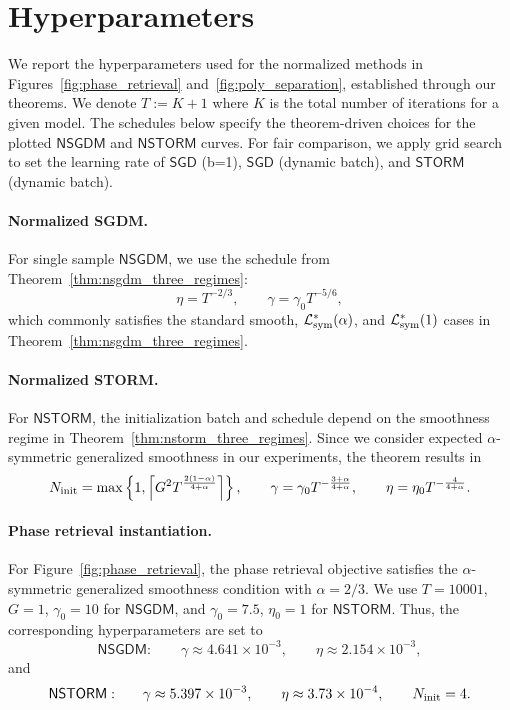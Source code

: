 \documentclass[letter,11pt]{article}
\newcommand{\Lcal}{\mathcal{L}}
\begin{document}
\section{Hyperparameters}
\label{app:exp_hyperparams}
We report the hyperparameters used for the normalized methods in Figures~\ref{fig:phase_retrieval} and~\ref{fig:poly_separation}, established through our theorems. We denote $T:=K+1$ where $K$ is the total number of iterations for a given model. The schedules below specify the theorem-driven choices for the plotted $\mathsf{NSGDM}$ and $\mathsf{NSTORM}$ curves. For fair comparison, we apply grid search to set the learning rate of $\mathsf{SGD}$ (b=1), $\mathsf{SGD}$ (dynamic batch), and $\mathsf{STORM}$ (dynamic batch).

\paragraph{Normalized SGDM.}
For single sample \(\mathsf{NSGDM}\), we use the schedule from Theorem~\ref{thm:nsgdm_three_regimes}:
\[
    \eta = T^{-2/3},
    \qquad
    \gamma = \gamma_0 T^{-5/6},
\]
which commonly satisfies the standard smooth, \(\Lcal_{\rm sym}^*(\alpha)\), and \(\Lcal_{\rm sym}^*(1)\) cases in Theorem~\ref{thm:nsgdm_three_regimes}.

\paragraph{Normalized STORM.}
For \(\mathsf{NSTORM}\), the initialization batch and schedule depend on the smoothness regime in Theorem~\ref{thm:nstorm_three_regimes}. Since we consider expected \(\alpha\)-symmetric generalized smoothness in our experiments, the theorem results in
\[
    N_{\rm init}
    =
    \max\left\{
        1,\left\lceil G^2T^{\frac{2(1-\alpha)}{4+\alpha}}\right\rceil
    \right\},
    \qquad
    \gamma=\gamma_0T^{-\frac{3+\alpha}{4+\alpha}},
    \qquad
    \eta=\eta_0T^{-\frac{4}{4+\alpha}}.
\]

\paragraph{Phase retrieval instantiation.}
For Figure~\ref{fig:phase_retrieval}, the phase retrieval objective satisfies the \(\alpha\)-symmetric generalized smoothness condition with \(\alpha=2/3\). We use \(T=10001\), \(G=1\), \(\gamma_0=10\) for \(\mathsf{NSGDM}\), and \(\gamma_0=7.5\), \(\eta_0=1\) for \(\mathsf{NSTORM}\). Thus, the corresponding hyperparameters are set to
\[
    \mathsf{NSGDM:}\qquad
    \gamma \approx 4.641\times 10^{-3},
    \qquad
    \eta \approx 2.154\times 10^{-3},
\]
and
\[
    \mathsf{NSTORM:}\qquad
    \gamma \approx 5.397\times 10^{-3},
    \qquad
    \eta \approx 3.73\times 10^{-4},
    \qquad
    N_{\rm init}=4.
\]
\end{document}

